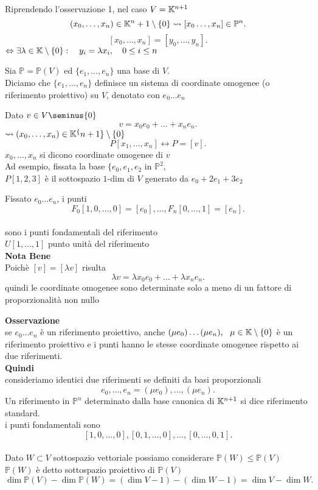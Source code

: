 \documentclass[12px]{article}
\begin{document}
	Riprendendo l'osservazione 1, nel caso $V=\mathbb{K}^{n+1}$
	 \[
		 (x_0,\ldots,x_n)\in\mathbb{K}^n+1\setminus\{0\} \leadsto [x_0\ldots,x_n]\in\mathbb{P}^n
	.\] 
	\[
		[x_0,\ldots,x_n]=[y_0,\ldots,y_n]
	.\] 
	$ \Leftrightarrow\exists \lambda\in\K\setminus\{0\}:\ \ \ y_i= \lambda x_i, \ \ \ 0\leq i\leq n$\\
	\begin{defi}
		Sia $\mathbb{P}=\mathbb{P}(V)$ ed $\{e_1,\ldots,e_n\}$ una base di $V$.\\
		Diciamo che $\{e_1,\ldots,e_n\}$ definisce un sistema di coordinate omogenee (o riferimento proiettivo) su $V$, denotato con $e_0\ldots e_n$
	\end{defi}
	Dato $v\in V\seminus\{0\}$
	 \[
	v= x_0e_0+\ldots +x_ne_n
	.\] 
	$\leadsto (x_0,\ldots,x_n)\in\mathbb{K}^\{n+1\}\setminus\{0\}$
	\[
		P[x_1,\ldots,x_n] \leftrightarrow P=[v]
	.\] 
	$x_0,\ldots,x_n$ si dicono coordinate omogenee di $v$
\\
Ad esempio, fissata la base $\{e_0,e_1,e_2$ in $\mathbb{P}^2$,\\
	$P[1,2,3]$ è il sottospazio $1 $-dim di $V$ generato da $e_0+2e_1+3e_2$\\
	\begin{nome}
		Fissato $e_0\ldots e_n$, i punti 
		\[
			F_0[1,0,\ldots,0] = [e_0],\ldots,F_n[0,\ldots,1]=[e_n] 
		.\] 
\\sono i punti fondamentali del riferimento\\
		$U[1,\ldots,1]$ punto unità del riferimento\\
		\textbf{Nota Bene}\\
		Poichè $[v] = [ \lambda v]$ risulta
		\[
		\lambda v = \lambda x_0e_0+\ldots+ \lambda x_n e_n
		.\] 
		quindi le coordinate omogenee sono determinate solo a meno di un fattore di proporzionalità non nullo
	\end{nome}
	\textbf{Osservazione}\\
	se $e_0\ldots e_n$ è un riferimento proiettivo, anche  $(\mu e_0)\ldots(\mu e_n), \ \ \mu\in\mathbb{K}\setminus\{0\}$ è un riferimento proiettivo e i punti hanno le stesse coordinate omogenee rispetto ai due riferimenti.\\
	\textbf{Quindi}\\
	consideriamo identici due riferimenti se definiti da basi proporzionali
	\[
	e_0,\ldots,e_n=(\mu e_0),\ldots,(\mu e_n)
	.\] 
	Un riferimento in $\mathbb{P}^n$ determinato dalla base canonica di $\mathbb{K}^{n+1}$ si dice riferimento standard. \\
	i punti fondamentali sono
	\[
		[1,0,\ldots,0],[0,1,\ldots,0],\ldots,[0,\ldots,0,1]
	.\] 
	\hline \ \\
	Dato $W\subset V$ sottospazio vettoriale possiamo considerare $\mathbb{P}(W)\leq \mathbb{P}(V)$\\
	$\mathbb{P}(W)$ è detto sottospazio proiettivo di $\mathbb{P}(V)$
	\[
		\dim\mathbb{P}(V)-\dim\mathbb{P}(W) = (\dim V-1) -(\dim W -1) = \dim V - \dim W
	.\] 
\end{document}
